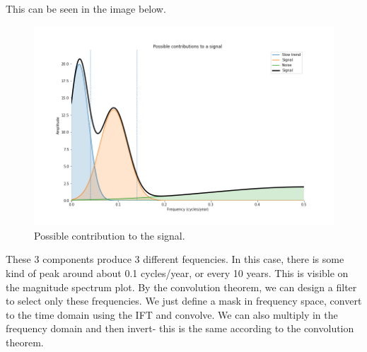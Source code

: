 \documentclass[a4paper, openany]{memoir}
\begin{document}
\noindent This can be seen in the image below.
\begin{figure}[H]
    \centering
    \includegraphics[scale=0.35]{src/6.27 3 components.png}
    \caption{Possible contribution to the signal.}
\end{figure}
\noindent These 3 components produce 3 different fequencies. In this case, there is some kind of peak around about 0.1 cycles/year, or every 10 years. This is visible on the magnitude spectrum plot. By the convolution theorem, we can design a filter to select only these frequencies. We just define a mask in frequency space, convert to the time domain using the IFT and convolve. We can also multiply in the frequency domain and then invert- this is the same according to the convolution theorem.
\end{document}
